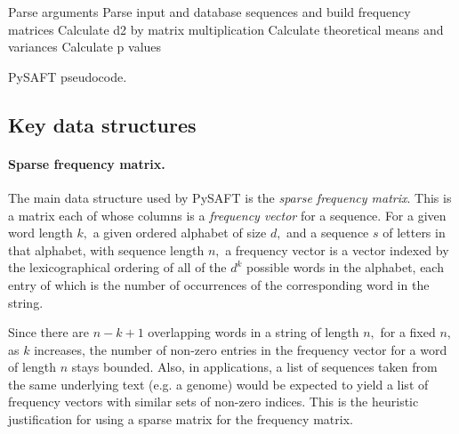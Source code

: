 \documentclass[11pt]{report}
\begin{document}
\begin{algorithm}
Parse arguments\;
Parse input and database sequences and build frequency matrices\;
Calculate d2 by matrix multiplication\;
Calculate theoretical means and variances\;
Calculate p values\;
\caption{PySAFT pseudocode.}
\label{pysaft-algorithm}
\end{algorithm}
\subsection{Key data structures}
\paragraph{Sparse frequency matrix.}
The main data structure used by PySAFT is the \emph{sparse frequency matrix}.
This is a matrix each of whose columns is a \emph{frequency vector} for a sequence.
For a given word length $k,$ a given ordered alphabet of size $d,$ 
and a sequence $s$ of letters in that alphabet, with sequence length $n,$
a frequency vector is a vector indexed by the lexicographical ordering of all of the $d^k$ possible
words in the alphabet, each entry of which is the number of occurrences of the corresponding word
in the string.

Since there are $n-k+1$ overlapping words in a string of length $n,$
for a fixed $n,$ as $k$ increases, the number of non-zero entries in the frequency vector for a word
of length $n$ stays bounded.
Also, in applications, a list of sequences taken from the same underlying text (e.g. a genome)
would be expected to yield a list of frequency vectors with similar sets of non-zero indices.
This is the heuristic justification for using a sparse matrix for the frequency matrix.
\end{document}
